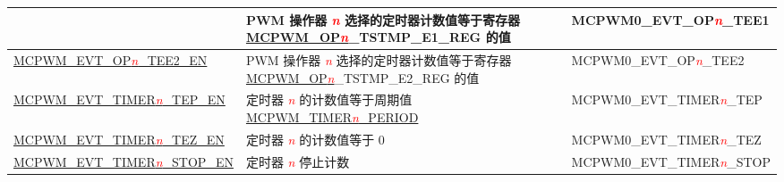 \begin{ThreePartTable}
\begin{longtable}[c]{| l | L{7cm} | l |}
    & PWM 操作器 \textcolor{red}{\it{n}} 选择的定时器计数值等于寄存器 \hyperref[regdesc:MCPWMOPNTSTMPE1REG]{MCPWM\_OP\textcolor{red}{\it{n}}}\_TSTMP\_E1\_REG 的值
    & MCPWM0\_EVT\_OP\textcolor{red}{\it{n}}\_TEE1    \\\hline
    \hyperref[fielddesc:MCPWMEVTOPNTEE2EN]{MCPWM\_EVT\_OP\textcolor{red}{\it{n}}\_TEE2\_EN}
    & PWM 操作器 \textcolor{red}{\it{n}} 选择的定时器计数值等于寄存器 \hyperref[regdesc:MCPWMOPNTSTMPE2REG]{MCPWM\_OP\textcolor{red}{\it{n}}}\_TSTMP\_E2\_REG 的值
    & MCPWM0\_EVT\_OP\textcolor{red}{\it{n}}\_TEE2    \\\hline
    \hyperref[fielddesc:MCPWMEVTTIMER0TEPEN]{MCPWM\_EVT\_TIMER\textcolor{red}{\it{n}}\_TEP\_EN}
    & 定时器 \textcolor{red}{\it{n}} 的计数值等于周期值 \hyperref[fielddesc:MCPWMTIMERNPERIOD]{MCPWM\_TIMER\textcolor{red}{\it{n}}\_PERIOD}
    & MCPWM0\_EVT\_TIMER\textcolor{red}{\it{n}}\_TEP    \\\hline
    \hyperref[fielddesc:MCPWMEVTTIMER0TEZEN]{MCPWM\_EVT\_TIMER\textcolor{red}{\it{n}}\_TEZ\_EN}
    & 定时器 \textcolor{red}{\it{n}} 的计数值等于 0
    & MCPWM0\_EVT\_TIMER\textcolor{red}{\it{n}}\_TEZ    \\\hline
    \hyperref[fielddesc:MCPWMEVTTIMER0STOPEN]{MCPWM\_EVT\_TIMER\textcolor{red}{\it{n}}\_STOP\_EN}
    & 定时器 \textcolor{red}{\it{n}} 停止计数
    & MCPWM0\_EVT\_TIMER\textcolor{red}{\it{n}}\_STOP   \\\hline
\end{longtable}
\end{ThreePartTable}